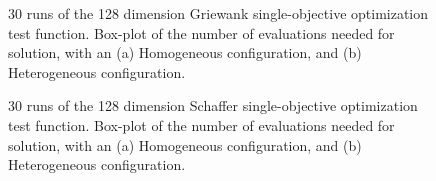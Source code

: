 \documentclass{llncs}
\begin{document}
\begin{figure}[b]
    \centering
      \caption{30 runs of the 128 dimension Griewank single-objective optimization test function. 
    Box-plot of the number of evaluations needed for solution, with an (a) Homogeneous configuration, and (b) Heterogeneous configuration.}
    \label{fig:griewank-evals}
\end{figure}

\begin{figure}[b]
    \centering
 

    \caption{30 runs of the 128 dimension Schaffer single-objective optimization test function. 
    Box-plot of the number of evaluations needed for solution, with an (a) Homogeneous configuration, and (b) Heterogeneous configuration.}
    \label{fig:schaffer}
\end{figure}
\end{document}

